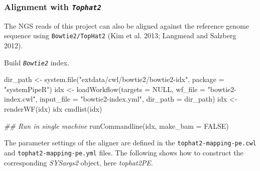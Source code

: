 \documentclass[14pt,]{article}
\newcommand{\hlnum}[1]{\textcolor[rgb]{0.816,0.125,0.439}{#1}}%
\newcommand{\hlstr}[1]{\textcolor[rgb]{0.251,0.627,0.251}{#1}}%
\newcommand{\hlcom}[1]{\textcolor[rgb]{0.502,0.502,0.502}{\textit{#1}}}%
\newcommand{\hlstd}[1]{\textcolor[rgb]{0.251,0.251,0.251}{#1}}%
\newenvironment{Shaded}{\begin{myshaded}}{\end{myshaded}}
\newcommand{\ConstantTok}[1]{\hlnum{#1}}
\newcommand{\StringTok}[1]{\hlstr{#1}}
\newcommand{\DocumentationTok}[1]{\hlcom{#1}}
\newcommand{\OtherTok}[1]{{#1}}
\newcommand{\FunctionTok}[1]{\hlstd{#1}}
\newcommand{\AttributeTok}[1]{{#1}}
\newcommand{\NormalTok}[1]{\hlstd{#1}}
\begin{document}
\hypertarget{alignment-with-tophat2}{%
\subsubsection{\texorpdfstring{Alignment with \emph{\texttt{Tophat2}}}{Alignment with Tophat2}}\label{alignment-with-tophat2}}

The NGS reads of this project can also be aligned against the reference genome
sequence using \texttt{Bowtie2/TopHat2} (Kim et al. 2013; Langmead and Salzberg 2012).

Build \emph{\texttt{Bowtie2}} index.

\begin{Shaded}
\begin{Highlighting}[]
\NormalTok{dir\_path }\OtherTok{\textless{}{-}} \FunctionTok{system.file}\NormalTok{(}\StringTok{"extdata/cwl/bowtie2/bowtie2{-}idx"}\NormalTok{, }\AttributeTok{package =} \StringTok{"systemPipeR"}\NormalTok{)}
\NormalTok{idx }\OtherTok{\textless{}{-}} \FunctionTok{loadWorkflow}\NormalTok{(}\AttributeTok{targets =} \ConstantTok{NULL}\NormalTok{, }\AttributeTok{wf\_file =} \StringTok{"bowtie2{-}index.cwl"}\NormalTok{, }\AttributeTok{input\_file =} \StringTok{"bowtie2{-}index.yml"}\NormalTok{, }
    \AttributeTok{dir\_path =}\NormalTok{ dir\_path)}
\NormalTok{idx }\OtherTok{\textless{}{-}} \FunctionTok{renderWF}\NormalTok{(idx)}
\NormalTok{idx}
\FunctionTok{cmdlist}\NormalTok{(idx)}

\DocumentationTok{\#\# Run in single machine}
\FunctionTok{runCommandline}\NormalTok{(idx, }\AttributeTok{make\_bam =} \ConstantTok{FALSE}\NormalTok{)}
\end{Highlighting}
\end{Shaded}

The parameter settings of the aligner are defined in the \texttt{tophat2-mapping-pe.cwl}
and \texttt{tophat2-mapping-pe.yml} files. The following shows how to construct the
corresponding \emph{SYSargs2} object, here \emph{tophat2PE}.
\end{document}
